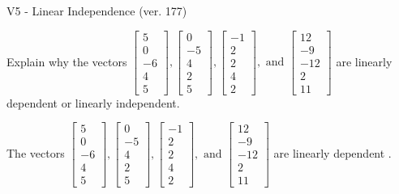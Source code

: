 \begin{exercise}
  \begin{exerciseTitle}V5 - Linear Independence (ver. 177)\end{exerciseTitle}
  \begin{exerciseStatement}
    Explain why the vectors \(\left[\begin{array}{r}
5 \\
0 \\
-6 \\
4 \\
5
\end{array}\right] , \left[\begin{array}{r}
0 \\
-5 \\
4 \\
2 \\
5
\end{array}\right] , \left[\begin{array}{r}
-1 \\
2 \\
2 \\
4 \\
2
\end{array}\right] , \text{ and } \left[\begin{array}{r}
12 \\
-9 \\
-12 \\
2 \\
11
\end{array}\right]\) are linearly dependent or linearly independent.	


  \end{exerciseStatement}
  \begin{exerciseAnswer}
   The vectors \(\left[\begin{array}{r}
5 \\
0 \\
-6 \\
4 \\
5
\end{array}\right] , \left[\begin{array}{r}
0 \\
-5 \\
4 \\
2 \\
5
\end{array}\right] , \left[\begin{array}{r}
-1 \\
2 \\
2 \\
4 \\
2
\end{array}\right] , \text{ and } \left[\begin{array}{r}
12 \\
-9 \\
-12 \\
2 \\
11
\end{array}\right]\) are 
  	 linearly dependent  .
  


  \end{exerciseAnswer}
\end{exercise}